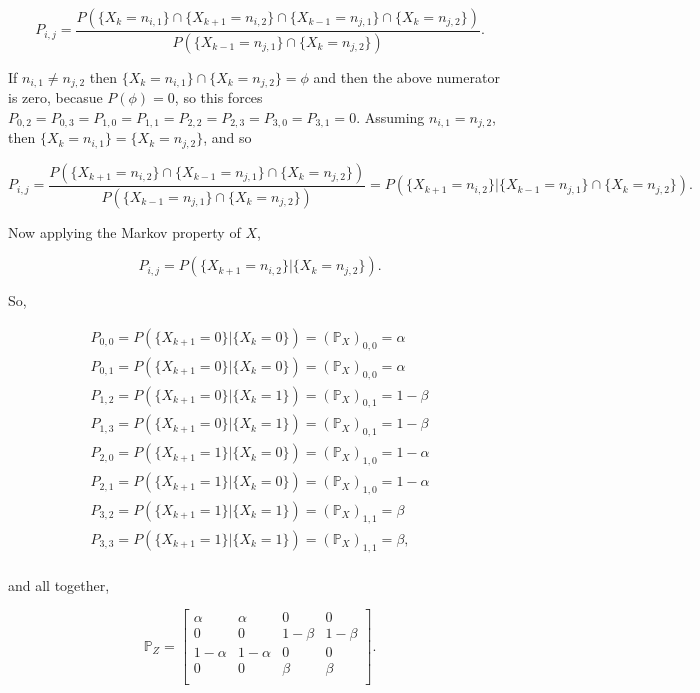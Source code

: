 \documentclass[12pt]{article}
\begin{document}
$$
P_{i,j} =  \frac{ P( \{ X_k = n_{i,1} \} \cap \{ X_{k+1} = n_{i,2} \} \cap \{ X_{k-1} = n_{j,1} \} \cap \{ X_k = n_{j,2} \}  ) }{ P( \{ X_{k-1} = n_{j,1} \} \cap \{ X_k = n_{j,2} \}  ) }.
$$

If $n_{i,1} \not = n_{j,2}$ then $\{ X_k = n_{i,1} \} \cap \{ X_k = n_{j,2} \} = \phi $ and then the above numerator is zero, becasue $P(\phi) = 0$, so this forces 
$P_{0,2} = P_{0,3} = P_{1,0} = P_{1,1} = P_{2,2} = P_{2,3} = P_{3,0} = P_{3,1} = 0$. Assuming $n_{i,1} = n_{j,2}$, then  $\{ X_k = n_{i,1} \} = \{ X_k = n_{j,2} \} $, and so

$$
P_{i,j} =  \frac{ P( \{ X_{k+1} = n_{i,2} \} \cap \{ X_{k-1} = n_{j,1} \} \cap \{ X_k = n_{j,2} \}  ) }{ P( \{ X_{k-1} = n_{j,1} \} \cap \{ X_k = n_{j,2} \}  ) } = P( \{ X_{k+1} = n_{i,2} \} | \{ X_{k-1} = n_{j,1} \} \cap \{ X_k = n_{j,2} \} ).
$$

\noindent
Now applying the Markov property of $X$,

$$
P_{i,j} =  P( \{ X_{k+1} = n_{i,2} \} | \{ X_k = n_{j,2} \} ).
$$

\noindent
So,

$$
\begin{array}{c} 
P_{0,0} = P( \{ X_{k+1} = 0 \} | \{ X_k = 0 \} ) = (\mathbb{P}_X)_{0,0} = \alpha  \\  
P_{0,1} = P( \{ X_{k+1} = 0 \} | \{ X_k = 0 \} ) = (\mathbb{P}_X)_{0,0} =  \alpha  \\  
P_{1,2} = P( \{ X_{k+1} = 0 \} | \{ X_k = 1 \} ) = (\mathbb{P}_X)_{0,1} =  1-\beta  \\  
P_{1,3} = P( \{ X_{k+1} = 0 \} | \{ X_k = 1 \} ) = (\mathbb{P}_X)_{0,1} =  1-\beta  \\  
P_{2,0} = P( \{ X_{k+1} = 1 \} | \{ X_k = 0 \} ) = (\mathbb{P}_X)_{1,0} =  1-\alpha  \\  
P_{2,1} = P( \{ X_{k+1} = 1 \} | \{ X_k = 0 \} ) = (\mathbb{P}_X)_{1,0} =  1-\alpha  \\  
P_{3,2} = P( \{ X_{k+1} = 1 \} | \{ X_k = 1 \} ) = (\mathbb{P}_X)_{1,1} =  \beta  \\  
P_{3,3} = P( \{ X_{k+1} = 1 \} | \{ X_k = 1 \} ) = (\mathbb{P}_X)_{1,1} =  \beta,   \\  
\end{array} 
$$

\noindent
and all together,

$$
\mathbb{P}_Z = \left[ \begin{array}{cccc} 
\alpha  & \alpha  & 0 & 0 \\
0 & 0 & 1-\beta  & 1-\beta  \\
1-\alpha & 1-\alpha & 0 & 0 \\
0 & 0 & \beta & \beta \\
\end{array} \right].
$$
\end{document}
